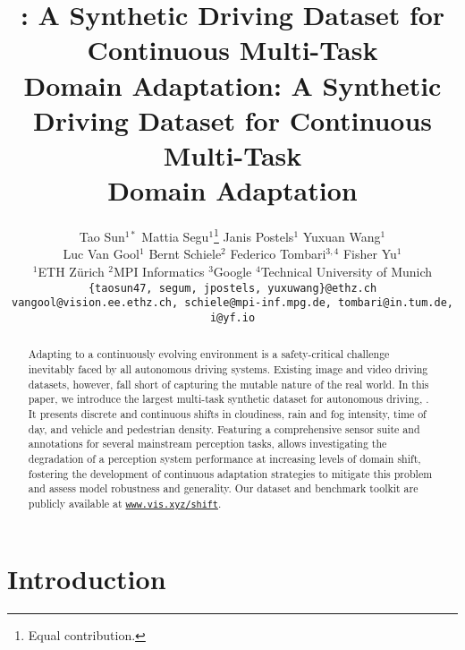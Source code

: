 \title{\thedataset: A Synthetic Driving Dataset for Continuous Multi-Task \\Domain Adaptation}



\title{\thedataset: A Synthetic Driving Dataset for Continuous Multi-Task \\Domain Adaptation}

\author{Tao Sun$^{1*}$ \quad Mattia Segu$^{1}$\thanks{Equal contribution.} \quad Janis Postels$^1$ \quad Yuxuan Wang$^1$ \quad \\
Luc Van Gool$^1$ \quad Bernt Schiele$^2$ \quad Federico Tombari$^{3,4}$ \quad Fisher Yu$^1$\\[0.4cm]
$^1$ETH Z\"urich \quad $^2$MPI Informatics \quad $^3$Google \quad $^4$Technical University of Munich \\
{\tt\small \{taosun47, segum, jpostels, yuxuwang\}@ethz.ch}\\ {\tt\small vangool@vision.ee.ethz.ch, schiele@mpi-inf.mpg.de, tombari@in.tum.de, i@yf.io}}

\maketitle

\begin{abstract}
Adapting to a continuously evolving environment is a safety-critical challenge inevitably faced by all autonomous driving systems.
Existing image and video driving datasets, however, fall short of capturing the mutable nature of the real world.
In this paper, we introduce the largest multi-task synthetic dataset for autonomous driving, \thedataset{}. 
It presents discrete and continuous shifts in cloudiness, rain and fog intensity, time of day, and vehicle and pedestrian density. 
Featuring a comprehensive sensor suite and annotations for several mainstream perception tasks, \thedataset{} allows investigating the degradation of a perception system performance at increasing levels of domain shift, fostering the development of continuous adaptation strategies to mitigate this problem and assess model robustness and generality.
Our dataset and benchmark toolkit are publicly available at \href{https://www.vis.xyz/shift}{\texttt{www.vis.xyz/shift}}. 
\end{abstract}

    

\section{Introduction}

